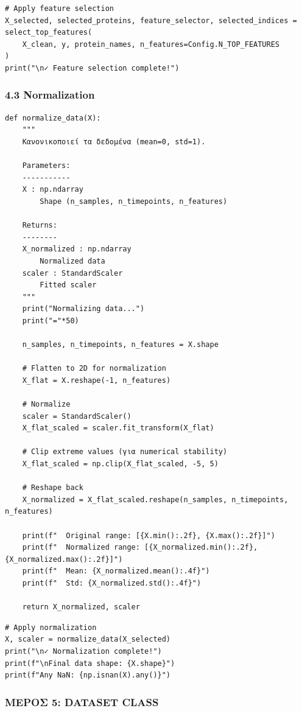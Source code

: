 \begin{lstlisting}
# Apply feature selection
X_selected, selected_proteins, feature_selector, selected_indices = select_top_features(
    X_clean, y, protein_names, n_features=Config.N_TOP_FEATURES
)
print("\n✓ Feature selection complete!")
\end{lstlisting}
 
\subsubsection*{4.3 Normalization}
 
\begin{lstlisting}
def normalize_data(X):
    """
    Κανονικοποιεί τα δεδομένα (mean=0, std=1).
 
    Parameters:
    -----------
    X : np.ndarray
        Shape (n_samples, n_timepoints, n_features)
 
    Returns:
    --------
    X_normalized : np.ndarray
        Normalized data
    scaler : StandardScaler
        Fitted scaler
    """
    print("Normalizing data...")
    print("="*50)
 
    n_samples, n_timepoints, n_features = X.shape
 
    # Flatten to 2D for normalization
    X_flat = X.reshape(-1, n_features)
 
    # Normalize
    scaler = StandardScaler()
    X_flat_scaled = scaler.fit_transform(X_flat)
 
    # Clip extreme values (για numerical stability)
    X_flat_scaled = np.clip(X_flat_scaled, -5, 5)
 
    # Reshape back
    X_normalized = X_flat_scaled.reshape(n_samples, n_timepoints, n_features)
 
    print(f"  Original range: [{X.min():.2f}, {X.max():.2f}]")
    print(f"  Normalized range: [{X_normalized.min():.2f}, {X_normalized.max():.2f}]")
    print(f"  Mean: {X_normalized.mean():.4f}")
    print(f"  Std: {X_normalized.std():.4f}")
 
    return X_normalized, scaler
\end{lstlisting}
 
\begin{lstlisting}
# Apply normalization
X, scaler = normalize_data(X_selected)
print("\n✓ Normalization complete!")
print(f"\nFinal data shape: {X.shape}")
print(f"Any NaN: {np.isnan(X).any()}")
\end{lstlisting}
 
\subsubsection*{ΜΕΡΟΣ 5: DATASET CLASS}
 

